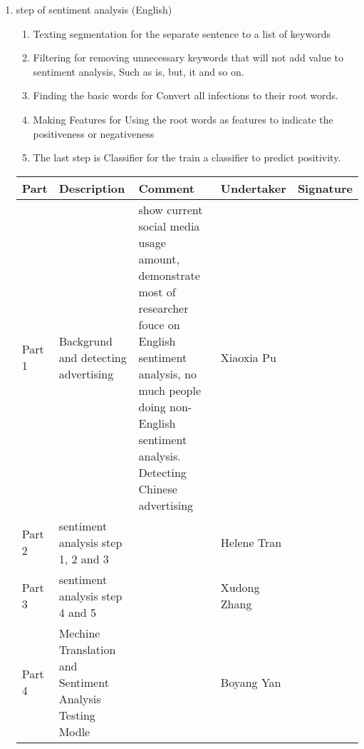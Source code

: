 \documentclass[9pt]{article}
\begin{document}
\begin{enumerate}
\item step of sentiment analysis (English)
\begin{enumerate}
\item Texting segmentation for the separate sentence to a list of keywords
\item Filtering for removing unnecessary keywords that will not add value to sentiment analysis, Such as is, but, it and so on.
\item Finding the basic words for Convert all infections to their root words.
\item Making Features for Using the root words as features to indicate the positiveness or negativeness
\item The last step is Classifier for the train a classifier to predict positivity.
\end{enumerate}
\begin{tabularx}{\textwidth}{p{1cm}|X|X|p{2cm}|p{2cm}}
  \textbf{Part} & \textbf{Description} & \textbf{Comment} & \textbf{Undertaker} & \textbf{Signature} \\
  \hline
  Part 1 & Backgrund and detecting advertising & show current social media usage
  amount, demonstrate most of researcher fouce on English sentiment analysis, no
  much people doing non-English sentiment analysis. Detecting Chinese
  advertising & Xiaoxia Pu & \\ \hline
Part 2 & sentiment analysis step 1, 2 and 3 &  & Helene Tran & \\ \hline
Part 3 & sentiment analysis step 4 and 5 &  & Xudong Zhang & \\ \hline
Part 4 & Mechine Translation and Sentiment Analysis Testing Modle &  & Boyang Yan & \\ \hline
\end{tabularx}
\end{enumerate}
\end{document}
